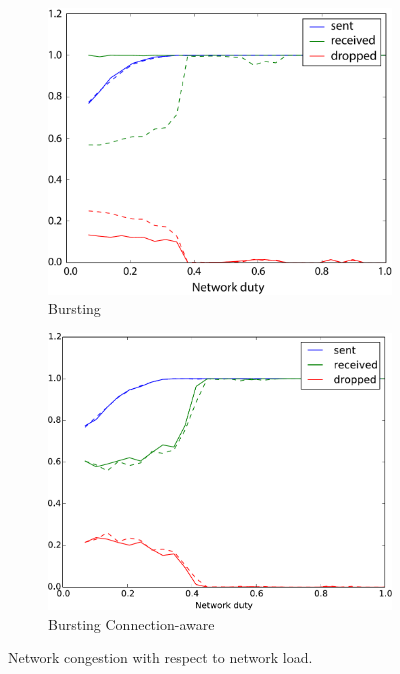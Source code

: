 \documentclass[a4paper, 11pt]{article}
\begin{document}
\begin{figure}
	\begin{subfigure}[htbp]{.5\linewidth}
		\centering
		\includegraphics[width=0.9\linewidth]{images/bursting.pdf}
		\caption{Bursting}
		\label{fig:bursting}
	\end{subfigure}
	\begin{subfigure}[htbp]{.5\linewidth}
		\centering
		\includegraphics[width=0.9\linewidth]{images/bursting_connaware2.pdf}
		\caption{Bursting Connection-aware}	
		\label{fig:bursting_aware}
	\end{subfigure}
	\caption{Network congestion with respect to network load.}
\end{figure}

%
\end{document}
